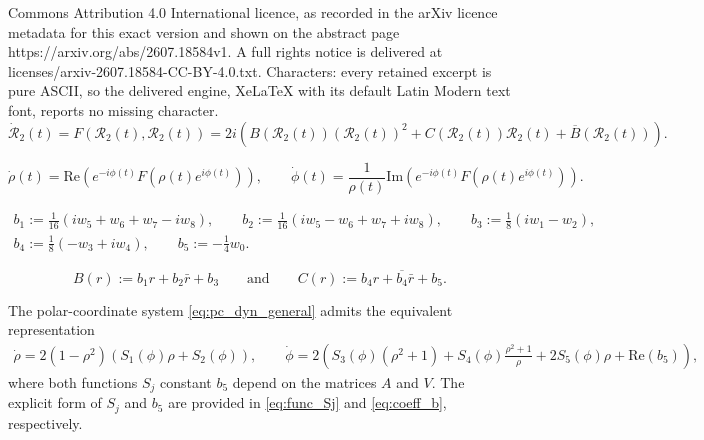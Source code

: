 \documentclass[10pt,a4paper]{amsart}
\newcommand{\CR}{\mathcal{R}}
\newcommand{\Dphi}{\Dot{\phi}}
\newcommand{\Drho}{\Dot{\rho}}
\newcommand{\im}[1]{\mathrm{Im} \left(#1\right)}
\newcommand{\re}[1]{\mathrm{Re}\left(#1\right)}
\begin{document}
Commons Attribution 4.0 International licence, as recorded in the arXiv licence metadata for this exact version and shown on the abstract page https://arxiv.org/abs/2607.18584v1. A full rights notice is delivered at licenses/arxiv-2607.18584-CC-BY-4.0.txt. Characters: every retained excerpt is pure ASCII, so the delivered engine, XeLaTeX with its default Latin Modern text font, reports no missing character.
    \begin{equation}\label{eq:dyn_r2}
    \Dot{\CR}_2(t) = F(\CR_2(t), \CR_2(t))
    = 2i \left( B(\CR_2(t)) (\CR_2(t))^2 + C(\CR_2(t)) \CR_2(t) + \overline{B}(\CR_2(t)) \right) .
    \end{equation}

\begin{equation}\label{eq:pc_dyn_general}
\Drho(t) = \re{e^{-i\phi(t)} F(\rho(t) e^{i\phi(t)})}, \qquad \Dphi(t) = \frac{1}{\rho(t)} \im{e^{-i\phi(t)} F(\rho(t) e^{i\phi(t)})} .
\end{equation}

\begin{equation}\label{eq:coeff_b}
    \begin{gathered}
    b_1 := \frac{1}{16}(iw_5+w_6+w_7-iw_8), \qquad b_2 := \frac{1}{16}(iw_5-w_6+w_7+iw_8), \qquad b_3 := \frac{1}{8}(iw_1-w_2),\\
    b_4 := \frac{1}{8}(-w_3+iw_4), \qquad b_5 := -\frac{1}{4}w_0.
    \end{gathered}
\end{equation}

\begin{equation}
    \label{eq:coeff_B_C}
         B(r)
        := b_1 r + b_2 \bar{r} + b_3
        \qquad
        \text{and}
        \qquad
        C(r)
        := b_4 r + \overline{b_4} \bar{r} + b_5.
    \end{equation}

\begin{lemma}\label{lem:pc_dyn_general_expand}
The polar-coordinate system \eqref{eq:pc_dyn_general} admits the equivalent representation
\begin{equation*}
    \begin{split}
        \Drho = 2(1-\rho^2) \left( S_1(\phi) \rho + S_2(\phi) \right), \qquad
        \Dphi = 2 \left( S_3(\phi) (\rho^2+1) + S_4(\phi) \frac{\rho^2 + 1}{\rho} + 2S_5(\phi) \rho + \re{b_5} \right),
    \end{split}
    \end{equation*}
where both functions $S_{j}$ constant $b_5$ depend on the matrices $A$ and $V$.
The explicit form of $S_j$ and $b_5$ are provided in \eqref{eq:func_Sj} and \eqref{eq:coeff_b}, respectively.
\end{lemma}
\end{document}
